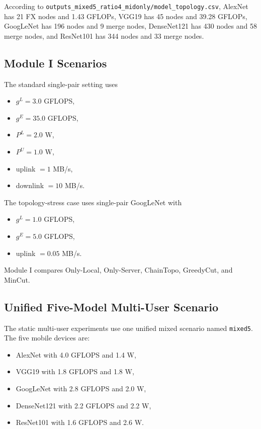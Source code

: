 \documentclass[conference]{IEEEtran}
\begin{document}
According to \texttt{outputs\_mixed5\_ratio4\_midonly/model\_topology.csv},
AlexNet has 21 FX nodes and 1.43 GFLOPs, VGG19 has 45 nodes and 39.28 GFLOPs,
GoogLeNet has 196 nodes and 9 merge nodes, DenseNet121 has 430 nodes and 58
merge nodes, and ResNet101 has 344 nodes and 33 merge nodes.

\subsection{Module I Scenarios}

The standard single-pair setting uses
\begin{itemize}
\item $g^L = 3.0$ GFLOPS,
\item $g^E = 35.0$ GFLOPS,
\item $P^L = 2.0$ W,
\item $P^U = 1.0$ W,
\item uplink $= 1$ MB/s,
\item downlink $= 10$ MB/s.
\end{itemize}

The topology-stress case uses single-pair GoogLeNet with
\begin{itemize}
\item $g^L = 1.0$ GFLOPS,
\item $g^E = 5.0$ GFLOPS,
\item uplink $= 0.05$ MB/s.
\end{itemize}

Module I compares Only-Local, Only-Server, ChainTopo, GreedyCut, and MinCut.

\subsection{Unified Five-Model Multi-User Scenario}

The static multi-user experiments use one unified mixed scenario named
\texttt{mixed5}. The five mobile devices are:
\begin{itemize}
\item AlexNet with 4.0 GFLOPS and 1.4 W,
\item VGG19 with 1.8 GFLOPS and 1.8 W,
\item GoogLeNet with 2.8 GFLOPS and 2.0 W,
\item DenseNet121 with 2.2 GFLOPS and 2.2 W,
\item ResNet101 with 1.6 GFLOPS and 2.6 W.
\end{itemize}
\end{document}
